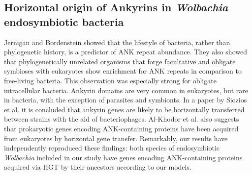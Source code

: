 \subsection{Horizontal origin of Ankyrins in \textit{Wolbachia} endosymbiotic
bacteria}
\label{horizontal_origin}
Jernigan and Bordenstein \cite{Jernigan2014} showed that the lifestyle of
bacteria, rather than phylogenetic history, is a predictor of ANK repeat
abundance. They also showed that phylogenetically unrelated organisms that
forge facultative and obligate symbioses with eukaryotes show enrichment for
ANK repeats in comparison to free-living bacteria. This observation was
especially strong for obligate intracellular bacteria. Ankyrin domains are very
common in eukaryotes, but rare in bacteria, with the exception of parasites and
symbionts. In a paper by Siozios et al. \cite{Siozios2013} it is concluded that
ankyrin genes are likely to be horizontally transferred between strains with
the aid of bacteriophages. Al-Khodor et al. \cite{Al-Khodor2010} also suggests
that prokaryotic genes encoding ANK-containing proteins have been acquired from
eukaryotes by horizontal gene transfer. Remarkably, our results have
independently reproduced these findings: both species of endosymbiotic
\textit{Wolbachia} included in our study have genes encoding ANK-containing
proteins acquired via HGT by their ancestors according to our models.
